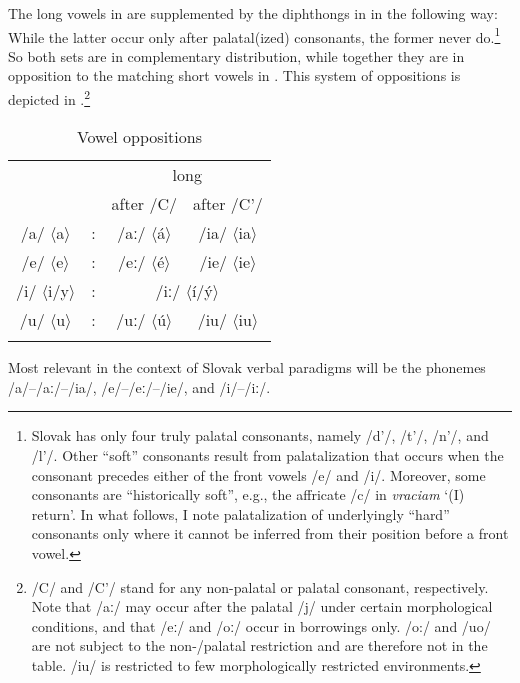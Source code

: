 \documentclass[output=paper,colorlinks,citecolor=brown]{langscibook}
\begin{document}
\noindent The long vowels in  are supplemented by the diphthongs in  in the following way: While the latter occur only after palatal(ized) consonants, the former never do.\footnote{Slovak has only four truly palatal consonants, namely /d'/, /t'/, /n'/, and /l'/. Other ``soft'' consonants result from palatalization that occurs when the consonant precedes either of the front vowels /e/ and /i/. Moreover, some consonants are ``historically soft'', e.g., the affricate /c/ in \textit{vraciam} `(I) return'. In what follows, I note palatalization of underlyingly ``hard'' consonants only where it cannot be inferred from their position before a front vowel.} So both sets are in complementary distribution, while together they are in opposition to the matching short vowels in . This system of oppositions is depicted in .\footnote{/C/ and /C'/ stand for any non-palatal or palatal consonant, respectively. Note that /aː/ may occur after the palatal /j/ under certain morphological conditions, and that /eː/ and /oː/ occur in borrowings only. /o:/ and /uo/ are not subject to the non-/palatal restriction and are therefore not in the table. /iu/ is restricted to few morphologically restricted environments.}


\begin{table}
\caption{Vowel oppositions}
\label{tab:pitsch:5}
 \begin{tabular}{cccc}
  \lsptoprule
  \multirow{2}{*}{short} & & \multicolumn{2}{c}{long} \\
  & & after /C/ & after /C'/ \\
  \midrule
  /a/ $\langle$a$\rangle$ & : & /aː/ $\langle$á$\rangle$ & /ia/ $\langle$ia$\rangle$ \\
  /e/ $\langle$e$\rangle$ & : & /eː/ $\langle$é$\rangle$ & /ie/ $\langle$ie$\rangle$ \\
  /i/ $\langle$i/y$\rangle$ & : & \multicolumn{2}{c}{/iː/ $\langle$í/ý$\rangle$} \\
  /u/ $\langle$u$\rangle$ & : & /uː/ $\langle$ú$\rangle$ & /iu/ $\langle$iu$\rangle$ \\
  \lspbottomrule
 \end{tabular}
\end{table}

Most relevant in the context of Slovak verbal paradigms will be the phonemes  /a/--/aː/--/ia/, /e/--/eː/--/ie/, and /i/--/iː/.
\end{document}
